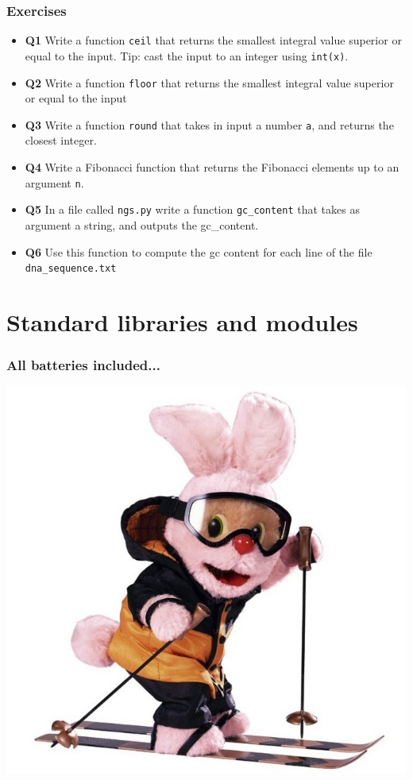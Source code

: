 \documentclass[xcolor=dvipsnames]{beamer}
\begin{document}
\begin{frame}
\frametitle{Exercises}
\begin{itemize}

\item \textbf{Q1} Write a function \texttt{ceil} that returns the smallest
integral value superior or equal to the input. Tip: cast the input to an
integer using \texttt{int(x)}.
\item \textbf{Q2} Write a function \texttt{floor} that returns the smallest
integral value superior or equal to the input
\item \textbf{Q3} Write a function \texttt{round} that takes in input a
number \texttt{a}, and returns the closest integer.
\item \textbf{Q4} Write a Fibonacci function that returns the Fibonacci
elements up to an argument \texttt{n}.
\item \textbf{Q5} In a file called \texttt{ngs.py} write a function
\texttt{gc\_content} that takes as argument a string, and outputs the
gc\_content.
\item \textbf{Q6} Use this function to compute the gc content for each line of
the file \texttt{dna\_sequence.txt}
\end{itemize}
\end{frame}

\section{Standard libraries and modules}
\begin{frame}
\frametitle{All batteries included...}
\begin{center}
\includegraphics{images/un-lapin-tout-terrain-duracell.jpg}
\end{center}
\end{frame}
\end{document}
